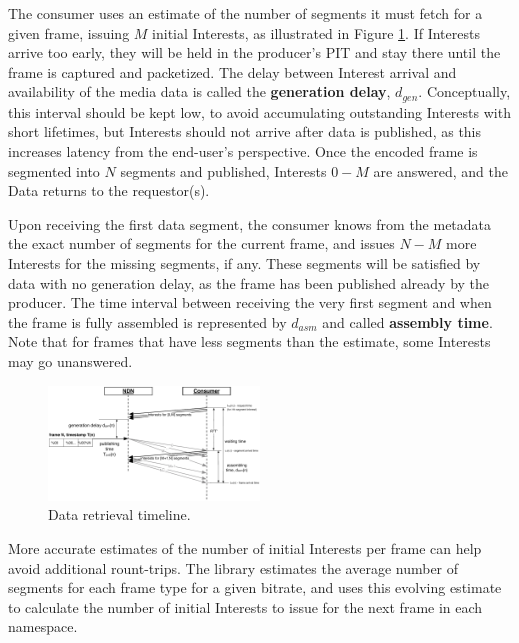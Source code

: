 \documentclass{icn/sig-alternate-2013} %
\begin{document}
The consumer uses an estimate of the number of segments it must fetch for a given frame, issuing $M$ initial Interests, as illustrated in Figure \ref{fig:pull}. If Interests arrive too early, they will be held in the producer's PIT and stay there until the frame is captured and packetized. The delay between Interest arrival and availability of the media data is called the \textbf{generation delay}, $d_{gen}$. Conceptually, this interval should be kept low, to avoid accumulating outstanding Interests with short lifetimes, but Interests should not arrive after data is published, as this increases latency from the end-user's perspective.  Once the encoded frame is segmented into $N$ segments and published, Interests $0 - M$ are answered, and the Data returns to the requestor(s). 

Upon receiving the first data segment, the consumer knows from the metadata the exact number of segments for the current frame, and issues $N - M$ more Interests for the missing segments, if any. These segments will be satisfied by data with no generation delay, as the frame has been published already by the producer. The time interval between receiving the very first segment and when the frame is fully assembled is represented by $d_{asm}$ and called \textbf{assembly time}. Note that for frames that have less segments than the estimate, some Interests may go unanswered.%
 

\begin{figure}[t!]
\centering
\includegraphics[width=0.5\textwidth]{frame-fetch}
\vspace{-18pt}
\caption{Data retrieval timeline.}
\label{fig:pull}
\end{figure}

More accurate estimates of the number of initial Interests per frame can help avoid additional rount-trips.
The library estimates the average number of segments for each frame type for a given bitrate, and uses this evolving estimate to calculate the number of initial Interests to issue for the next frame in each namespace. %
\end{document}

